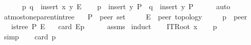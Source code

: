 \begin{isabellebody}
\ \ \ \ \ \ {\isachardoublequoteopen}{\isacharparenleft}{\kern0pt}p{\isacharcomma}{\kern0pt}\ q{\isacharparenright}{\kern0pt}\ {\isasymin}\ insert\ {\isacharparenleft}{\kern0pt}x{\isacharcomma}{\kern0pt}\ y{\isacharparenright}{\kern0pt}\ E{\isachardoublequoteclose}\isanewline
\ \ \isamarkupfalse%
\ {\isachardoublequoteopen}p\ {\isasymin}\ insert\ y\ P{\isachardoublequoteclose}\ \ {\isachardoublequoteopen}q\ {\isasymin}\ insert\ y\ P{\isachardoublequoteclose}\isanewline
\ \ \ \ \isamarkupfalse%
\ auto\isanewline
{}\isamarkupfalse%
%
\endisatagproof
{\isafoldproof}%
%
\isadelimproof
\isanewline
%
\endisadelimproof
\isanewline
{}\isamarkupfalse%
\ at{\isacharunderscore}{\kern0pt}most{\isacharunderscore}{\kern0pt}one{\isacharunderscore}{\kern0pt}parent{\isacharunderscore}{\kern0pt}in{\isacharunderscore}{\kern0pt}tree{\isacharcolon}{\kern0pt}\isanewline
\ \ \ P\ {\isacharcolon}{\kern0pt}{\isacharcolon}{\kern0pt}\ {\isachardoublequoteopen}{\isacharprime}{\kern0pt}peer\ set{\isachardoublequoteclose}\isanewline
\ \ \ \ \ E\ {\isacharcolon}{\kern0pt}{\isacharcolon}{\kern0pt}\ {\isachardoublequoteopen}{\isacharprime}{\kern0pt}peer\ topology{\isachardoublequoteclose}\isanewline
\ \ \ \ \ p\ {\isacharcolon}{\kern0pt}{\isacharcolon}{\kern0pt}\ {\isachardoublequoteopen}{\isacharprime}{\kern0pt}peer{\isachardoublequoteclose}\isanewline
\ \ \ {\isachardoublequoteopen}is{\isacharunderscore}{\kern0pt}tree\ P\ E{\isachardoublequoteclose}\isanewline
\ \ \ {\isachardoublequoteopen}card\ {\isacharparenleft}{\kern0pt}E{\isasymlangle}{\isasymrightarrow}p{\isasymrangle}{\isacharparenright}{\kern0pt}\ {\isasymle}\ {}{\isachardoublequoteclose}\isanewline
%
\isadelimproof
\ \ %
\endisadelimproof
%
\isatagproof
{}\isamarkupfalse%
\ assms\isanewline
{}\isamarkupfalse%
\ induct\isanewline
\ \ \isamarkupfalse%
\ {\isacharparenleft}{\kern0pt}ITRoot\ x{\isacharparenright}{\kern0pt}\isanewline
\ \ \isamarkupfalse%
\ {\isachardoublequoteopen}{\isacharbraceleft}{\kern0pt}{\isacharbraceright}{\kern0pt}{\isasymlangle}{\isasymrightarrow}p{\isasymrangle}\ {\isacharequal}{\kern0pt}\ {\isacharbraceleft}{\kern0pt}{\isacharbraceright}{\kern0pt}{\isachardoublequoteclose}\isanewline
\ \ \ \ \isamarkupfalse%
\ simp\isanewline
\ \ \isamarkupfalse%
\ {\isachardoublequoteopen}card\ {\isacharparenleft}{\kern0pt}{\isacharbraceleft}{\kern0pt}{\isacharbraceright}{\kern0pt}{\isasymlangle}{\isasymrightarrow}p{\isasymrangle}{\isacharparenright}{\kern0pt}\ {\isasymle}\ {}{\isachardoublequoteclose}\isanewline

\end{isabellebody}
